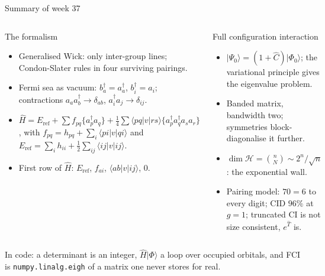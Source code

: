 \documentclass[aspectratio=169,10pt]{beamer}
\newcommand{\ket}[1]{\vert #1\rangle}
\newcommand{\element}[3]{\langle #1\vert #2\vert #3\rangle}
\newcommand{\nc}[1]{\bigl\{#1\bigr\}}
\begin{document}
\begin{frame}{Summary of week 37}
  \small
  \begin{columns}[T]
    \begin{block}{The formalism}
      \begin{itemize}
        \item Generalised Wick: only inter-group lines; Condon-Slater rules in four surviving pairings.
        \item Fermi sea as vacuum: $b_a^{\dagger}=a_a^{\dagger}$, $b_i^{\dagger}=a_i$; contractions $a_aa_b^{\dagger}\to\delta_{ab}$, $a_i^{\dagger}a_j\to\delta_{ij}$.
        \item $\hat{H}=E_{\mathrm{ref}}+\sum f_{pq}\nc{a_p^{\dagger}a_q}+\frac14\sum\element{pq}{v}{rs}\nc{a_p^{\dagger}a_q^{\dagger}a_sa_r}$, with $f_{pq}=h_{pq}+\sum_i\element{pi}{v}{qi}$ and $E_{\mathrm{ref}}=\sum_ih_{ii}+\frac12\sum_{ij}\element{ij}{v}{ij}$.
        \item First row of $\hat{H}$: $E_{\mathrm{ref}}$, $f_{ai}$, $\element{ab}{v}{ij}$, $0$.
      \end{itemize}
    \end{block}
    \begin{block}{Full configuration interaction}
      \begin{itemize}
        \item $\ket{\Psi_0}=(1+\hat{C})\ket{\Phi_0}$; the variational principle gives the eigenvalue problem.
        \item Banded matrix, bandwidth two; symmetries block-diagonalise it further.
        \item $\dim\mathcal{H}=\binom{n}{N}\sim2^n/\sqrt{n}$: the exponential wall.
        \item Pairing model: $70=6$ to every digit; CID $96\%$ at $g=1$; truncated CI is not size consistent, $e^{\hat{T}}$ is.
      \end{itemize}
    \end{block}
  \end{columns}
  {\small In code: a determinant is an integer, $\hat{H}\ket{\Phi}$ a loop over occupied orbitals, and FCI is \texttt{numpy.linalg.eigh} of a matrix one never stores for real.}
\end{frame}
\end{document}
